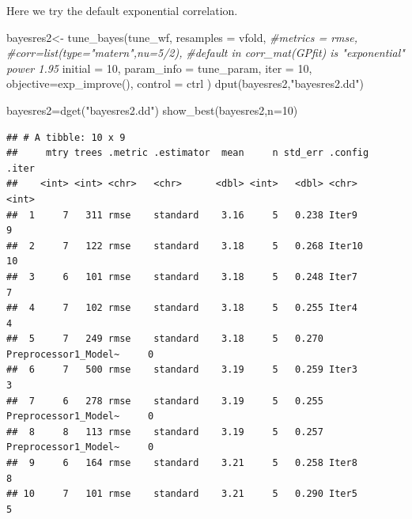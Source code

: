 \documentclass[
  ignorenonframetext,
]{beamer}
\newenvironment{Shaded}{\begin{snugshade}}{\end{snugshade}}
\newcommand{\AttributeTok}[1]{\textcolor[rgb]{0.77,0.63,0.00}{#1}}
\newcommand{\CommentTok}[1]{\textcolor[rgb]{0.56,0.35,0.01}{\textit{#1}}}
\newcommand{\DecValTok}[1]{\textcolor[rgb]{0.00,0.00,0.81}{#1}}
\newcommand{\FunctionTok}[1]{\textcolor[rgb]{0.00,0.00,0.00}{#1}}
\newcommand{\NormalTok}[1]{#1}
\newcommand{\OtherTok}[1]{\textcolor[rgb]{0.56,0.35,0.01}{#1}}
\newcommand{\StringTok}[1]{\textcolor[rgb]{0.31,0.60,0.02}{#1}}
\begin{document}
\begin{frame}[fragile]
Here we try the default exponential correlation.

\begin{Shaded}
\begin{Highlighting}[]
\NormalTok{bayesres2}\OtherTok{\textless{}{-}} \FunctionTok{tune\_bayes}\NormalTok{(tune\_wf,}
    \AttributeTok{resamples =}\NormalTok{ vfold,}
    \CommentTok{\#metrics = rmse,}
    \CommentTok{\#corr=list(type="matern",nu=5/2), }
    \CommentTok{\#default in corr\_mat(GPfit) is "exponential" power 1.95}
    \AttributeTok{initial =} \DecValTok{10}\NormalTok{,}
    \AttributeTok{param\_info =}\NormalTok{ tune\_param,}
    \AttributeTok{iter =} \DecValTok{10}\NormalTok{,}
    \AttributeTok{objective=}\FunctionTok{exp\_improve}\NormalTok{(),}
    \AttributeTok{control =}\NormalTok{ ctrl}
\NormalTok{  )}
\FunctionTok{dput}\NormalTok{(bayesres2,}\StringTok{"bayesres2.dd"}\NormalTok{)}
\end{Highlighting}
\end{Shaded}

\begin{Shaded}
\begin{Highlighting}[]
\NormalTok{bayesres2}\OtherTok{=}\FunctionTok{dget}\NormalTok{(}\StringTok{"bayesres2.dd"}\NormalTok{)}
\FunctionTok{show\_best}\NormalTok{(bayesres2,}\AttributeTok{n=}\DecValTok{10}\NormalTok{)}
\end{Highlighting}
\end{Shaded}

\begin{verbatim}
## # A tibble: 10 x 9
##     mtry trees .metric .estimator  mean     n std_err .config              .iter
##    <int> <int> <chr>   <chr>      <dbl> <int>   <dbl> <chr>                <int>
##  1     7   311 rmse    standard    3.16     5   0.238 Iter9                    9
##  2     7   122 rmse    standard    3.18     5   0.268 Iter10                  10
##  3     6   101 rmse    standard    3.18     5   0.248 Iter7                    7
##  4     7   102 rmse    standard    3.18     5   0.255 Iter4                    4
##  5     7   249 rmse    standard    3.18     5   0.270 Preprocessor1_Model~     0
##  6     7   500 rmse    standard    3.19     5   0.259 Iter3                    3
##  7     6   278 rmse    standard    3.19     5   0.255 Preprocessor1_Model~     0
##  8     8   113 rmse    standard    3.19     5   0.257 Preprocessor1_Model~     0
##  9     6   164 rmse    standard    3.21     5   0.258 Iter8                    8
## 10     7   101 rmse    standard    3.21     5   0.290 Iter5                    5
\end{verbatim}


\end{frame}
\end{document}

